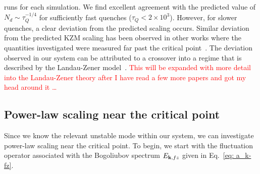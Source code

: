 runs for each simulation.
We find excellent agreement with the predicted value of
\(N_d \sim \tau_Q^{-1/4}\) for sufficiently fast quenches (\(\tau_Q < 2
\times 10^3\)).
However, for slower quenches, a clear deviation from the predicted scaling
occurs.
Similar deviation from the predicted KZM scaling has been observed in other
works where the quantities investigated were measured far past the critical
point~\cite{Su2013, Swislocki2013}.
The deviation observed in our system can be attributed to a crossover into a
regime that is described by the Landau-Zener model~\cite{Zurek2005,Damski2005,
Pellegrini2008,Divakaran2008}.
\textcolor{red}{This will be expanded with more detail into the
Landau-Zener theory after I have read a few more papers and got my head around
it \ldots}

\subsection{Power-law scaling near the critical point}
Since we know the relevant unstable mode within our system, we can investigate
power-law scaling near the critical point.
To begin, we start with the fluctuation operator associated with the
Bogoliubov spectrum \(E_{\vb{k}, fz}\) given in Eq.~\eqref{eq: a_k-fz}.
